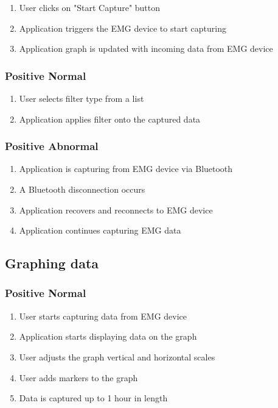\documentclass[12pt,a4paper]{article}
\begin{document}
\begin{enumerate}
	\item User clicks on "Start Capture" button
	\item Application triggers the EMG device to start capturing
	\item Application graph is updated with incoming data from EMG device
\end{enumerate}

\subsubsection{Positive Normal}

\begin{enumerate}
	\item User selects filter type from a list
	\item Application applies filter onto the captured data
\end{enumerate}

\subsubsection{Positive Abnormal}

\begin{enumerate}
	\item Application is capturing from EMG device via Bluetooth
	\item A Bluetooth disconnection occurs
	\item Application recovers and reconnects to EMG device
	\item Application continues capturing EMG data
\end{enumerate}

\subsection{Graphing data}

\subsubsection{Positive Normal}

\begin{enumerate}
	\item User starts capturing data from EMG device
	\item Application starts displaying data on the graph
	\item User adjusts the graph vertical and horizontal scales
	\item User adds markers to the graph
	\item Data is captured up to 1 hour in length
\end{enumerate}
\end{document}
